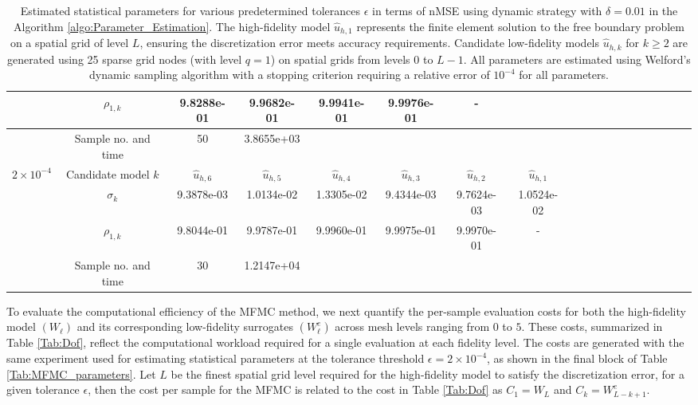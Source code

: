 \begin{table}[ht]
{\begin{tabular}{|c|c|c|c|c|c|c|c|c|c|c|c|c|c|c|c|c|c|c|}
\cline{2-7}	
&\multicolumn{1}{|c|}{$\rho_{1,k}$}&9.8288e-01&9.9682e-01&9.9941e-01  &9.9976e-01&- &\\
\hline
&\multicolumn{1}{|c|}{Sample no. and time}&50&3.8655e+03\\
\hline
\multirow{3}{*}{$2\times 10^{-4}$} &\multicolumn{1}{|c|}{Candidate model $k$} &$\widehat u_{h,6}$&$\widehat u_{h,5}$&$\widehat u_{h,4}$&$\widehat u_{h,3}$&$\widehat u_{h,2}$&$\widehat u_{h,1}$\\
\cline{2-8}
&\multicolumn{1}{|c|}{$\sigma_{k}$}&9.3878e-03&1.0134e-02&1.3305e-02&9.4344e-03&9.7624e-03&1.0524e-02\\
\cline{2-8}	
&\multicolumn{1}{|c|}{$\rho_{1,k}$}&9.8044e-01&9.9787e-01&9.9960e-01&9.9975e-01&9.9970e-01   &-\\
\hline
&\multicolumn{1}{|c|}{Sample no. and time}&30&1.2147e+04\\
\hline
\end{tabular}}
\caption{Estimated statistical parameters for various predetermined tolerances $\epsilon$ in terms of nMSE using dynamic strategy with $\delta=0.01$ in the Algorithm \ref{algo:Parameter_Estimation}. The high-fidelity model $\widehat u_{h,1}$ represents the finite element solution to the free boundary problem on a spatial grid of level $L$, ensuring the discretization error meets accuracy requirements. Candidate low-fidelity models $\widehat u_{h,k}$ for $k \geq 2$ are generated using 25 sparse grid nodes (with level $q=1$) on spatial grids from levels 0 to $L-1$. All parameters are estimated using Welford's dynamic sampling algorithm with a stopping criterion requiring a relative error of $10^{-4}$ for all parameters.}
\label{Tab:MFMC_parameters_dynamic}
\end{table}
%


To evaluate the computational efficiency of the MFMC method, we next quantify the per-sample evaluation costs for both the high-fidelity model $(W_\ell)$ and its corresponding low-fidelity surrogates $(W_\ell^e)$ across mesh levels ranging from $0$ to $5$. These costs, summarized in Table \ref{Tab:Dof}, reflect the computational workload required for a single evaluation at each fidelity level. The costs are generated with the same experiment used for estimating statistical parameters at the tolerance threshold $\epsilon=2\times 10^{-4}$, as shown in the final block of Table \ref{Tab:MFMC_parameters}. Let $L$ be the finest spatial grid level required for the high-fidelity model to satisfy the discretization error, for a given tolerance $\epsilon$, then the cost per sample for the MFMC is related to the cost in Table \ref{Tab:Dof} as $C_1=W_{L}$ and $C_k=W_{L-k+1}^e$.

